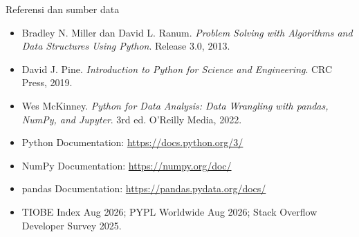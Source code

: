 \documentclass[aspectratio=169,11pt]{beamer}
\begin{document}
\begin{frame}{Referensi dan sumber data}
\footnotesize
\begin{itemize}
  \item Bradley N. Miller dan David L. Ranum. \textit{Problem Solving with Algorithms and Data Structures Using Python}. Release 3.0, 2013.
  \item David J. Pine. \textit{Introduction to Python for Science and Engineering}. CRC Press, 2019.
  \item Wes McKinney. \textit{Python for Data Analysis: Data Wrangling with pandas, NumPy, and Jupyter}. 3rd ed. O'Reilly Media, 2022.
  \item Python Documentation: \url{https://docs.python.org/3/}
  \item NumPy Documentation: \url{https://numpy.org/doc/}
  \item pandas Documentation: \url{https://pandas.pydata.org/docs/}
  \item TIOBE Index Aug 2026; PYPL Worldwide Aug 2026; Stack Overflow Developer Survey 2025.
\end{itemize}
\end{frame}
\end{document}
